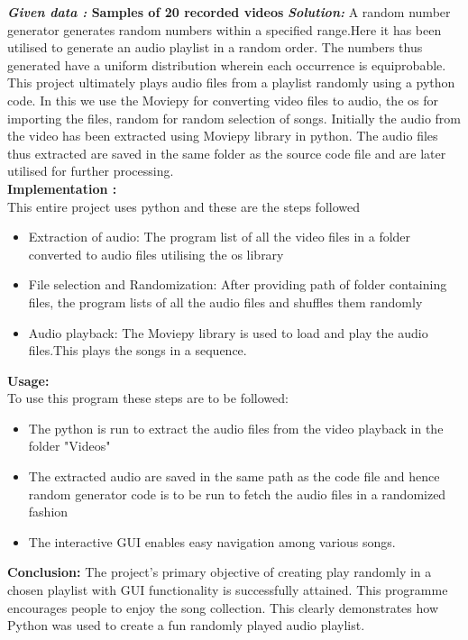 \documentclass[journal,12pt,twocolumn]{IEEEtran}
\begin{document}
\textbf{\emph{Given data :} Samples of 20 recorded videos  }
\newline
\newline
{\textbf{ \emph{Solution:}} A random number generator generates random numbers within a specified range.Here it has been utilised to generate an audio playlist in a random order. The numbers thus generated have a uniform distribution wherein each occurrence is equiprobable.}
{
This project ultimately plays audio files from a playlist randomly using a python code. In this we use the Moviepy for converting video files to audio, the os for importing the files, random for random selection of songs.
Initially the audio from the video has been extracted using Moviepy library in python.
The audio files thus extracted are saved in the same folder as the source code file and are later utilised for further processing.
}\\
 \textbf{Implementation :}\\
 This entire project uses python and these are the steps followed \\
 \begin{itemize}
     \item Extraction of audio: The program list of all the video files in a folder converted to audio files utilising the os library \\ 
  \item File selection and Randomization: After providing path of folder containing files, the program lists of all the audio files and shuffles them randomly \\
   \item Audio playback: The Moviepy library is used to load and play the audio files.This plays the songs in a sequence.
 
 \end{itemize}
 \textbf{Usage:} \\
To use this program these steps are to be followed: \\
\begin{itemize}
    
  \item The python is run to extract the audio files from the video playback in the folder "Videos" \\
 \item The extracted audio are saved in the same path as the code file and hence random generator code is to be run to fetch the audio files in a randomized fashion \\
 \item The interactive GUI enables easy navigation among various songs. 
\end{itemize}

\textbf{Conclusion:} 
The project's primary objective of creating play randomly in a chosen playlist with GUI functionality is successfully attained.
This programme encourages people to enjoy the song collection. This clearly demonstrates how Python was used to create a fun randomly played audio playlist.
\end{document}
